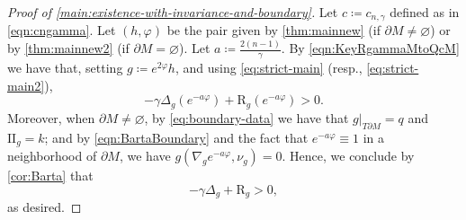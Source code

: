 \documentclass[11pt]{amsart}
\numberwithin{equation}{section}
\newcommand{\scal}{\mathrm{R}}
\begin{document}
\begin{proof}[Proof of \cref{main:existence-with-invariance-and-boundary}]
    Let $c\coloneqq c_{n,\gamma}$ defined as in \eqref{eqn:cngamma}. Let $(h,\varphi)$ be the pair given by \cref{thm:mainnew} (if $\partial M\not=\varnothing$) or by \cref{thm:mainnew2} (if $\partial M=\varnothing$). Let $a\coloneqq \frac{2(n-1)}{\gamma}$. By \eqref{eqn:KeyRgammaMtoQcM} we have that, setting $g\coloneqq e^{2\varphi}h$, and using \eqref{eq:strict-main} (resp., \eqref{eq:strict-main2}),
    \begin{equation}\label{eqn:BartaBoundary}
    -\gamma\Delta_g(e^{-a\varphi})+\scal_g (e^{-a\varphi}) >0.
    \end{equation}
    Moreover, when $\partial M\neq\varnothing$, by \eqref{eq:boundary-data} we have that $g|_{T\partial M}=q$ and $\mathrm{II}_g=k$; and by \eqref{eqn:BartaBoundary} and the fact that $e^{-a\varphi}\equiv 1$ in a neighborhood of $\partial M$, we have $g(\nabla_g e^{-a\varphi},\nu_g)=0$. Hence, we conclude by \cref{cor:Barta} that
    \[
    -\gamma\Delta_g+\scal_g>0,
    \]
    as desired.
\end{proof}


\appendix
{}
\end{document}
